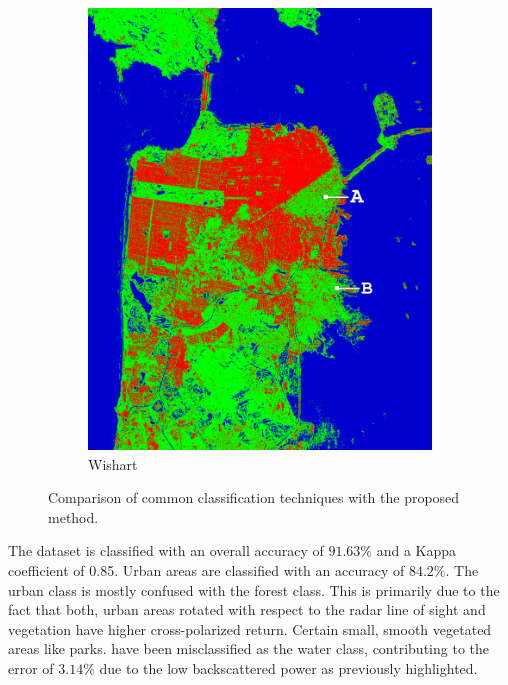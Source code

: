 \begin{figure}[!b]
\begin{subfigure}[t]{0.19\textwidth}
		\includegraphics[trim={150px 80px 40px 50px},clip,width=\columnwidth]{Figures/ALOS2_SF_3Class/wishart_supervised_class_1x1} 
		\caption{Wishart}
		\label{fig:al2_wish_1}
	\end{subfigure}
	\caption{Comparison of common classification techniques with the proposed method.}
	\label{fig:comparison_al2}
\end{figure}

The dataset is classified with an overall accuracy of $91.63\%$ and a Kappa coefficient of 0.85. Urban areas are classified with an accuracy of $84.2\%$. The urban class is mostly confused with the forest class. This is primarily due to the fact that both, urban areas rotated with respect to the radar line of sight and vegetation have higher cross-polarized return. Certain small, smooth vegetated areas like parks. have been misclassified as the water class, contributing to the error of $3.14\%$ due to the low backscattered power as  previously highlighted. 


